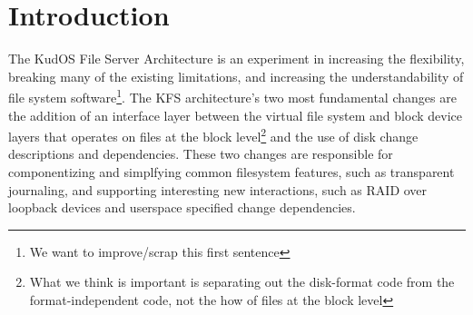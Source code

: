 \section{Introduction}
\label{sec:intro}

The KudOS File Server Architecture is an experiment in increasing the
flexibility, breaking many of the existing limitations, and increasing
the understandability of file system software\footnote{We want to
  improve/scrap this first sentence}.  The KFS architecture's two most
fundamental changes are the addition of an interface layer between the
virtual file system and block device layers that operates on files at
the block level\footnote{What we think is important is separating out the disk-format code from the format-independent code, not the how of files at the block level} and the use of disk change descriptions and
dependencies. These two changes are responsible for componentizing and
simplfying common filesystem features, such as transparent journaling,
and supporting interesting new interactions, such as RAID over
loopback devices and userspace specified change dependencies.
